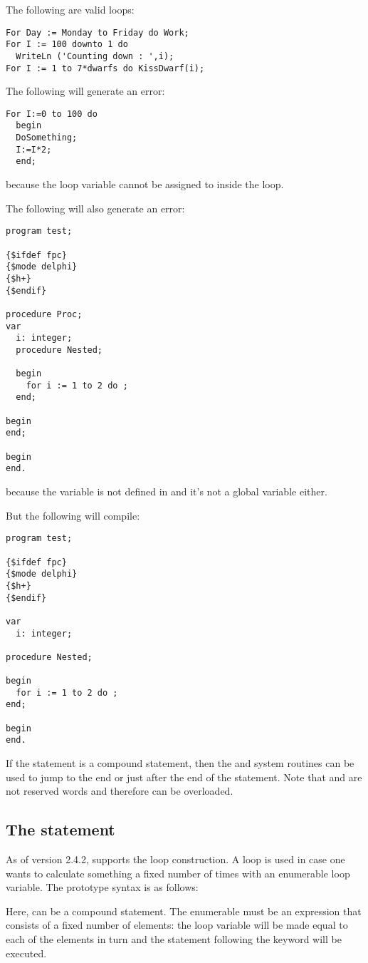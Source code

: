 The following are valid loops:
\begin{verbatim}
For Day := Monday to Friday do Work;
For I := 100 downto 1 do
  WriteLn ('Counting down : ',i);
For I := 1 to 7*dwarfs do KissDwarf(i);
\end{verbatim}
The following will generate an error:
\begin{verbatim}
For I:=0 to 100 do
  begin
  DoSomething;
  I:=I*2;
  end;
\end{verbatim}
because the loop variable  cannot be assigned to inside the loop.

The following will also generate an error:
\begin{verbatim}
program test;

{$ifdef fpc}
{$mode delphi}
{$h+}
{$endif}

procedure Proc;
var
  i: integer;
  procedure Nested;

  begin
    for i := 1 to 2 do ;
  end;

begin
end;

begin
end.
\end{verbatim}
because the variable  is not defined in  and it's not
a global variable either.

But the following will compile:
\begin{verbatim}
program test;

{$ifdef fpc}
{$mode delphi}
{$h+}
{$endif}

var
  i: integer;

procedure Nested;

begin
  for i := 1 to 2 do ;
end;

begin
end.
\end{verbatim}


If the statement is a compound statement, then the  and
 system routines can be used to jump to the end or just
after the end of the  statement. Note that  and
 are not reserved words and therefore can be overloaded.

\subsection{The  statement}
\label{se:forin}
As of version 2.4.2, \fpc supports the  loop construction. A
 loop is used in case one wants to calculate something a fixed number of times
with an enumerable loop variable. The prototype syntax is as follows:

Here,  can be a compound statement. The enumerable must be an
expression that consists of a fixed number of elements: the loop variable
will be made equal to each of the elements in turn and the statement following the
 keyword will be executed.

